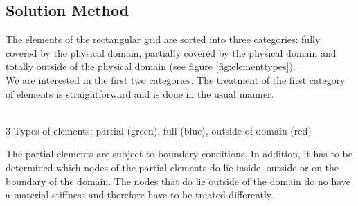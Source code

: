 \documentclass[a4paper,12pt]{article}
\makeatletter
\newenvironment{figurehere}
  {\def\@captype{figure}}
  {}
\makeatother
\begin{document}
\newpage
\subsection{Solution Method}\label{sec:algorithm}
The elements of the rectangular grid are sorted into three categories: fully covered by the physical domain, partially covered by the physical domain and totally outside of the physical domain (see figure \ref{fig:elementtypes}).\\ We are interested in the first two categories. The treatment of the first category of elements is straightforward and is done in the usual manner. 
\begin{center}
\begin{figurehere} 
\\
\caption{$3$ Types of elements: partial (green), full (blue), outside of domain (red)}\label{fig:elementtypes}
\end{figurehere}
\end{center}
The partial elements are subject to boundary conditions. In addition, it has to be determined which nodes of the partial elements do lie inside, outside or on the boundary of the domain. The nodes that do lie outside of the domain do no have a material stiffness and therefore have to be treated differently.\\ 
\end{document}
